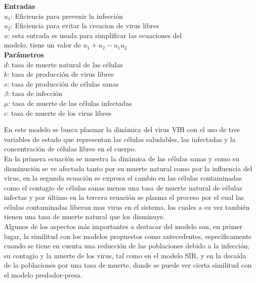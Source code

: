 \documentclass{article}
\begin{document}
\large{\bf{Entradas}}\\

\noindent
$u_1$: Eficiencia para prevenir la infección \\
$u_2$: Eficiencia para evitar la creacion de virus libres\\
$u$: esta entrada es usada para simplificar las ecuaciones del\\
     modelo, tiene un valor de $u_1+u_2-u_1 u_2$\\

\large{\bf{Parámetros}}\\

\noindent
$d$: tasa de muerte natural de las células \\
$k$: tasa de producción de virus libres \\
$s$: tasa de producción de células sanas \\
$\beta$: tasa de infección\\
$\mu$: tasa de muerte de las células infectadas \\
$c$: tasa de muerte de los virus libres\\
\cite{model}

\vspace{1cm}

En este modelo se busca plasmar la dinámica del virus VIH con el uso de tres
variables de estado que representan las células saludables, las infectadas y la
concentración de células libres en el cuerpo.\\

En la primera ecuación se muestra la dinámica de las células sanas y como su
disminución se ve afectada tanto por su muerte natural como por la influencia
del virus, en la segunda ecuación se expresa el cambio en las células
contaminadas como el contagio de células sanas menos una tasa de muerte natural
de células infectas y por último en la tercera ecuación se plasma el proceso
por el cual las células contaminadas liberan mas virus en el sistema, los
cuales a su vez también tienen una tasa de muerte natural que los disminuye.\\

Algunos de los aspectos más importantes a destacar del modelo son, en primer
lugar, la similitud con los modelos propuestos como antecedentes,
específicamente cuando se tiene en cuenta una reducción de las poblaciones
debido a la infección, su contagio y la muerte de los virus, tal como en el
modelo SIR, y en la decaída de la poblaciones por una tasa de muerte, donde se
puede ver cierta similitud con el modelo predador-presa.\\
        
\end{document}
